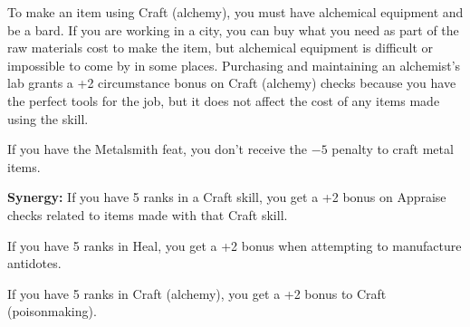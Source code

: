To make an item using Craft (alchemy), you must have alchemical equipment and be a bard. If you are working in a city, you can buy what you need as part of the raw materials cost to make the item, but alchemical equipment is difficult or impossible to come by in some places. Purchasing and maintaining an alchemist's lab grants a +2 circumstance bonus on Craft (alchemy) checks because you have the perfect tools for the job, but it does not affect the cost of any items made using the skill.

If you have the Metalsmith feat, you don't receive the $-5$ penalty to craft metal items.

\textbf{Synergy:} If you have 5 ranks in a Craft skill, you get a +2 bonus on Appraise checks related to items made with that Craft skill.

If you have 5 ranks in Heal, you get a +2 bonus when attempting to
manufacture antidotes.

If you have 5 ranks in Craft (alchemy), you get a +2 bonus to Craft (poisonmaking).